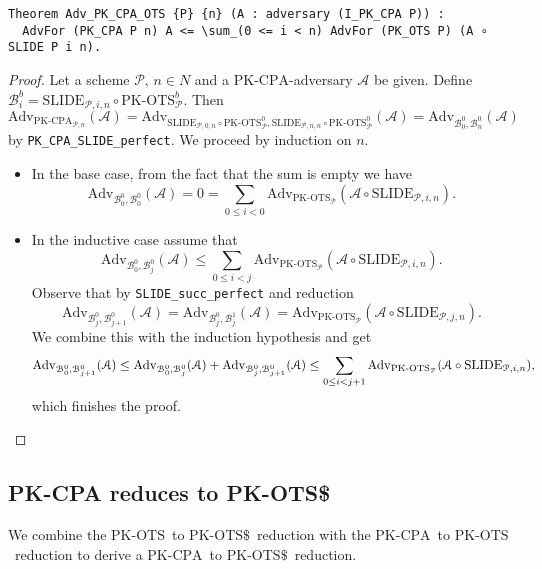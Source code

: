 \documentclass[a4paper,USenglish,cleveref, autoref]{lipics-v2021}
\newcommand{\M}[1]{\texttt{#1}}
\newcommand{\Adv}{\mathrm{Adv}}
\newcommand{\A}{\mathcal{A}}
\renewcommand{\P}{\mathcal{P}}
\newcommand{\CPA}{\ensuremath{\mathrm{PK\text{-}CPA}}}
\newcommand{\OTS}{\ensuremath{\mathrm{PK\text{-}OTS}}}
\newcommand{\OTSR}{\ensuremath{\mathrm{PK\text{-}OTS\$}}}
\newcommand{\SLIDE}{\ensuremath{\mathrm{SLIDE}}}
\begin{document}
\begin{verbatim}
Theorem Adv_PK_CPA_OTS {P} {n} (A : adversary (I_PK_CPA P)) :
  AdvFor (PK_CPA P n) A <= \sum_(0 <= i < n) AdvFor (PK_OTS P) (A ∘ SLIDE P i n).
\end{verbatim}
\begin{proof}
  Let a scheme $\P$, $n \in N$ and a \CPA-adversary $\A$ be given.
  Define $\mathcal{B}_i^b = \SLIDE_{\P, i, n} \circ \OTS_\P^b$.
  Then
  $$\Adv_{\CPA_{\P,n}}(\A)
    = \Adv_{\SLIDE_{\P, 0, n} \circ \OTS_{\P}^0,
            \SLIDE_{\P, n, n} \circ \OTS_{\P}^0 }(\A) = \Adv_{\mathcal{B}_0^0,\mathcal{B}_n^0}(\A)$$
  by \M{PK_CPA_SLIDE_perfect}.
  We proceed by induction on $n$.
  \begin{itemize}
  \item In the base case, from the fact that the sum is empty we have
  $$\Adv_{\mathcal{B}_0^0, \mathcal{B}_0^0}(\A)
      = 0 = \sum_{0 \leq i < 0} \Adv_{\OTS_\P}(\A \circ \SLIDE_{\P,i,n}).$$
  \item In the inductive case assume that 
    $$\Adv_{\mathcal{B}_0^0, \mathcal{B}_j^0}(\A) \leq
      \sum_{0 \leq i < j} \Adv_{\OTS_\P}(\A \circ \SLIDE_{\P,i,n}).$$
    Observe that by \M{SLIDE_succ_perfect} and reduction
      $$\Adv_{\mathcal{B}_j^0,\mathcal{B}_{j+1}^0}(\A)
      = \Adv_{\mathcal{B}_j^0,\mathcal{B}_{j}^1}(\A) 
      = \Adv_{\OTS_\P}(\A \circ \SLIDE_{\P,j,n}).
      $$
    We combine this with the induction hypothesis and get
    $$
        \Adv_{\mathcal{B}_0^0, \mathcal{B}_{j+1}^0}(\A) \leq
        \Adv_{\mathcal{B}_0^0, \mathcal{B}_j^0}(\A)
        + \Adv_{\mathcal{B}_j^0, \mathcal{B}_{j+1}^0}(\A) \\
        \leq \sum_{0 \leq i < j+1} \Adv_{\OTS_\P}(\A \circ \SLIDE_{\P,i,n}),
        $$
    which finishes the proof.
  \end{itemize}
\end{proof}

\subsection{PK-CPA reduces to PK-OTS\$} \label{sec:cpaotsr}

We combine the \OTS\ to \OTSR\ reduction with the \CPA\ to \OTS\ reduction
to derive a \CPA\ to \OTSR\ reduction.
\end{document}
